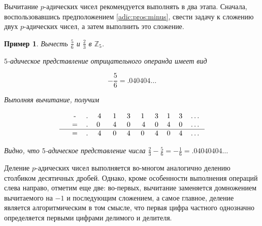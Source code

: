 \documentclass[master, och, diploma, times]{sty/SCWorks}
\theoremstyle{plain}
\newtheorem{exmp}{Пример}[section]
\theoremstyle{definition}
\begin{document}
Вычитание $p$-адических чисел рекомендуется выполнять в два этапа. Сначала, воспользовавшись предположением \ref{adic:pros:minus}, свести задачу к сложению двух $p$-адических чисел, а затем выполнить это сложение.

\begin{exmp}
Вычесть $\frac{5}{6}$ и $\frac{2}{3}$ в $\mathbb{Z}_5$.

\noindent $5$-адическое представление отрицательного операнда имеет вид

$$
-\frac{5}{6}=.040404\dots
$$

\noindent Выполняя вычитание, получим

$$
\begin{tabular}{cccccccccccc}
& - & . & 4\; & 1\; & 3\; & 1\; & 3 & 1 & 3 & \dots \\
& = & . & 0 \; & 4\; & 0\; & 4 & 0 & 4 & 0 & \dots \\
\hline
& = & . & 4\; & 0\; & 4\; & 0\; & 4 & 0 & 4 & \dots
\end{tabular}
$$

\noindent Видно, что $5$-адическое представление числа $\frac{2}{3} - \frac{5}{6}=-\frac{1}{6}=.04040404\dots$
\end{exmp}


Деление $p$-адических чисел выполняется во-многом аналогично делению столбиком десятичных дробей. Однако, кроме особенности выполнения операций слева направо, отметим еще две: во-первых, вычитание заменяется домножением вычитаемого на $-1$ и последующим сложением, а самое главное, деление является алгоритмическим в том смысле, что первая цифра частного однозначно определяется первыми цифрами делимого и делителя.
\end{document}
